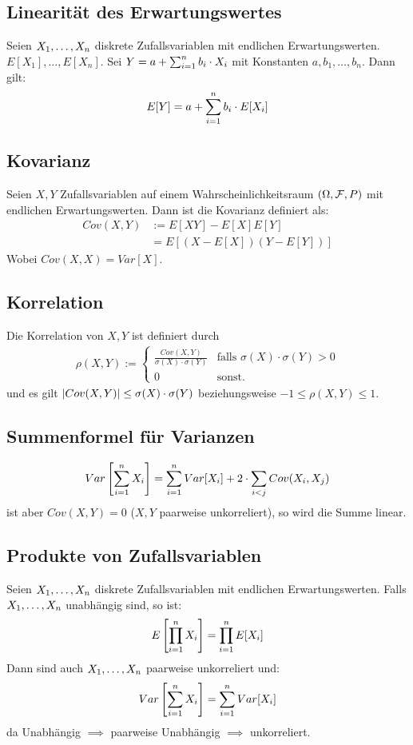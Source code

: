 \subsection*{Linearität des Erwartungswertes}
Seien $X_1, \dots, X_n$ diskrete Zufallsvariablen mit endlichen
Erwartungswerten. $E[X_1], \dots, E[X_n]$. Sei $Y = a + \sum_{i = 1}^n b_i \cdot X_i$ mit
Konstanten $a, b_1, \dots, b_n$. Dann gilt:
\begin{align*}
  E[Y] = a + \sum_{i = 1}^n b_i \cdot E[X_i]
\end{align*}
\subsection*{Kovarianz}
Seien $X, Y$ Zufallsvariablen auf einem Wahrscheinlichkeitsraum $ (\Omega, \mathcal{F},
  P)$ mit endlichen Erwartungswerten. Dann ist die Kovarianz definiert als:
\begin{align*}
  Cov (X, Y) & := E[XY] - E[X]E[Y]          \\
             & = E[ (X - E[X])  (Y - E[Y])]
\end{align*}
Wobei $Cov (X, X) = Var[X]$.
\subsection*{Korrelation}
Die Korrelation von $X, Y$ ist definiert durch
\begin{align*}
  \rho (X, Y) := \begin{cases}
                   \frac{Cov (X, Y)}{\sigma (X) \cdot \sigma (Y)} & \text{falls } \sigma (X) \cdot \sigma (Y) > 0 \\
                   0                                              & \text{sonst.}
                 \end{cases}
\end{align*}
und es gilt $\abs{Cov (X, Y)} \leq \sigma (X) \cdot \sigma (Y)$
beziehungsweise $-1 \leq \rho (X, Y) \leq 1$.
\subsection*{Summenformel für Varianzen}
\begin{align*}
  Var \left[ \sum_{i = 1}^n X_i \right] = \sum_{i = 1}^n Var[X_i] + 2 \cdot \sum_{i < j} Cov (X_i, X_j)
\end{align*}
ist aber $Cov (X, Y) = 0$  ($X, Y$ paarweise unkorreliert), so wird
die Summe linear.
\subsection*{Produkte von Zufallsvariablen}
Seien $X_1, \dots, X_n$ diskrete Zufallsvariablen mit endlichen
Erwartungswerten. Falls $X_1, \dots, X_n$ unabhängig sind, so ist:
\begin{align*}
  E \left[ \prod_{i = 1}^n X_i \right] = \prod_{i = 1}^n E[X_i]
\end{align*}
Dann sind auch $X_1, \dots, X_n$ paarweise unkorreliert und:
\begin{align*}
  Var \left[ \sum_{i = 1}^n X_i \right] = \sum_{i = 1}^n Var[X_i]
\end{align*}
da Unabhängig $\implies$ paarweise Unabhängig $\implies$ unkorreliert.
